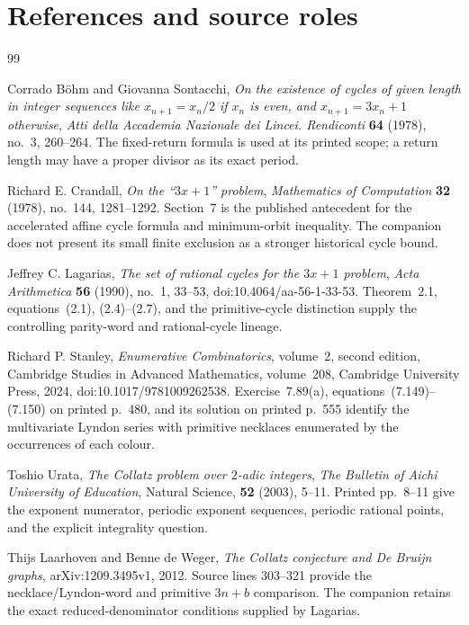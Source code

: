 \clearpage
\section*{References and source roles}
\begin{thebibliography}{99}

Corrado B\"ohm and Giovanna Sontacchi,
\emph{On the existence of cycles of given length in integer sequences like
$x_{n+1}=x_n/2$ if $x_n$ is even, and $x_{n+1}=3x_n+1$ otherwise},
\emph{Atti della Accademia Nazionale dei Lincei. Rendiconti}
\textbf{64} (1978), no.~3, 260--264.
The fixed-return formula is used at its printed scope; a return length may
have a proper divisor as its exact period.

Richard E. Crandall,
\emph{On the ``$3x+1$'' problem},
\emph{Mathematics of Computation} \textbf{32} (1978), no.~144,
1281--1292.
Section~7 is the published antecedent for the accelerated affine cycle
formula and minimum-orbit inequality.  The companion does not present its
small finite exclusion as a stronger historical cycle bound.

Jeffrey C. Lagarias,
\emph{The set of rational cycles for the $3x+1$ problem},
\emph{Acta Arithmetica} \textbf{56} (1990), no.~1, 33--53,
doi:10.4064/aa-56-1-33-53.
Theorem~2.1, equations~(2.1), (2.4)--(2.7), and the primitive-cycle
distinction supply the controlling parity-word and rational-cycle lineage.

Richard P. Stanley,
\emph{Enumerative Combinatorics}, volume~2, second edition,
Cambridge Studies in Advanced Mathematics, volume~208,
Cambridge University Press, 2024,
doi:10.1017/9781009262538.
Exercise~7.89(a), equations~(7.149)--(7.150) on printed p.~480, and its
solution on printed p.~555 identify the multivariate Lyndon series with
primitive necklaces enumerated by the occurrences of each colour.

Toshio Urata,
\emph{The Collatz problem over $2$-adic integers},
\emph{The Bulletin of Aichi University of Education}, Natural Science,
\textbf{52} (2003), 5--11.
Printed pp.~8--11 give the exponent numerator, periodic exponent sequences,
periodic rational points, and the explicit integrality question.

Thijs Laarhoven and Benne de Weger,
\emph{The Collatz conjecture and De Bruijn graphs},
arXiv:1209.3495v1, 2012.
Source lines 303--321 provide the necklace/Lyndon-word and primitive
$3n+b$ comparison.  The companion retains the exact reduced-denominator
conditions supplied by Lagarias.


\end{thebibliography}
